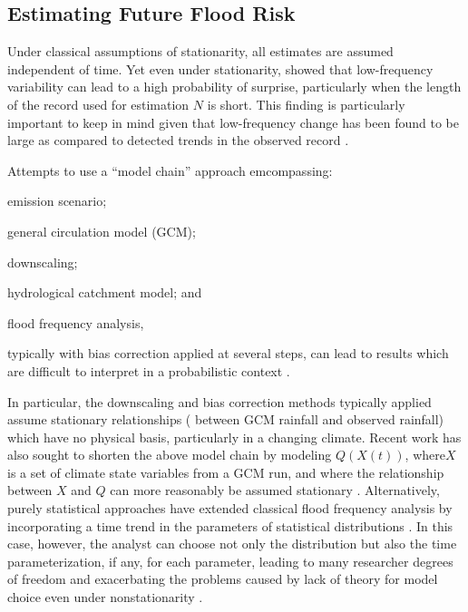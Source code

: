\documentclass[12pt]{article}
\begin{document}
\subsection{Estimating Future Flood Risk}

Under classical assumptions of stationarity, all estimates are assumed independent of time.
Yet even under stationarity, \citet{Jain2001} showed that low-frequency variability can lead to a high probability of surprise, particularly when the length of the record used for estimation \(N\) is short.
This finding is particularly important to keep in mind given that low-frequency change has been found to be large as compared to detected trends in the observed record \citep{Hodgkins2017}.

Attempts to use a ``model chain'' approach emcompassing:
\begin{enumerate*}[label= (\roman*) ]
  \item emission scenario;
  \item general circulation model (GCM);
  \item downscaling;
  \item hydrological catchment model; and
  \item flood frequency analysis,
\end{enumerate*}
typically with bias correction applied at several steps, can lead to results which are difficult to interpret in a probabilistic context \citep{Dankers2009,Ott2013,Merz2014,Dittes2017}.

In particular, the downscaling and bias correction methods typically applied assume stationary relationships (\eg{} between GCM rainfall and observed rainfall) which have no physical basis, particularly in a changing climate.
Recent work has also sought to shorten the above model chain by modeling \( Q(X(t)) \), where\( X \) is a set of climate state variables from a GCM run, and where the relationship between \(X\) and \(Q\) can more reasonably be assumed stationary \citep{Hall2014,Delgado2014,Silva2016}.
Alternatively, purely statistical approaches have extended classical flood frequency analysis by incorporating a time trend in the parameters of statistical distributions \citep{Obeysekera2014,Vogel2011,Serinaldi2015,Strupczewski2001}.
In this case, however, the analyst can choose not only the distribution but also  the time parameterization, if any, for each parameter, leading to many researcher degrees of freedom \citep[``forking paths'' or ``multiple comparisons'';][]{Gelman2013} and exacerbating the problems caused by lack of theory for model choice even under nonstationarity \citep{Kidson2016}.
\end{document}
